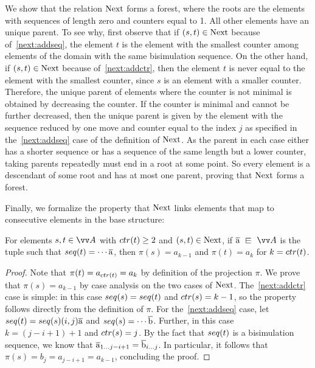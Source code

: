 We show that the relation $\mathrm{Next}$ forms a forest, where the roots are the elements with sequences of length zero and counters equal to 1.
All other elements have an unique parent.
To see why, first observe that if $(s, t) \in \mathrm{Next}$ because of~\ref{next:addseq}, the element $t$ is the element with the smallest counter among elements of the domain with the same bisimulation sequence.
On the other hand, if $(s, t) \in \mathrm{Next}$ because of~\ref{next:addctr}, then the element $t$ is never equal to the element with the smallest counter, since $s$ is an element with a smaller counter.
Therefore, the unique parent of elements where the counter is not minimal is obtained by decreasing the counter.
If the counter is minimal and cannot be further decreased, then the unique parent is given by the element with the sequence reduced by one move and counter equal to the index $j$ as specified in the~\ref{next:addseq} case of the definition of $\mathrm{Next}$.
As the parent in each case either has a shorter sequence or has a sequence of the same length but a lower counter, taking parents repeatedly must end in a root at some point.
So every element is a descendant of some root and has at most one parent, proving that $\mathrm{Next}$ forms a forest.

Finally, we formalize the property that $\mathrm{Next}$ links elements that map to consecutive elements in the base structure:
\begin{lemma}\label{lem:projection-next}
For elements $s, t \in \unraveldom{A}$ with $\ctr{t} \ge 2$ and $(s,t) \in \mathrm{Next}$, if $\elemtuplea \sqin \unraveldom{A}$ is the tuple such that $\seq{t} = \cdots \elemtuplea$, then $\pi(s) = a_{k-1}$ and $\pi(t) = a_{k}$ for $k = \ctr{t}$.
\end{lemma}
\begin{proof}
  Note that $\pi(t) = a_{\ctr{t}} = a_{k}$ by definition of the projection $\pi$.
  We prove that $\pi(s) = a_{k-1}$ by case analysis on the two cases of $\mathrm{Next}$.
  The~\ref{next:addctr} case is simple: in this case $\seq{s} = \seq{t}$ and $\ctr{s} = k - 1$, so the property follows directly from the definition of $\pi$.
  For the~\ref{next:addseq} case, let $\seq{t} = \seq{s} (i,j) \elemtuplea$ and $\seq{s} = \cdots \elemtupleb$.
  Further, in this case $k = (j - i + 1) + 1$ and $\ctr{s} = j$.
  By the fact that $\seq{t}$ is a bisimulation sequence, we know that $\overline{\mathrm{a}}_{1\ldots j-i+1} = \overline{\mathrm{b}}_{i\ldots j}$.
  In particular, it follows that $\pi(s) = b_{j} = a_{j-i+1} = a_{k-1}$, concluding the proof.
\end{proof}

